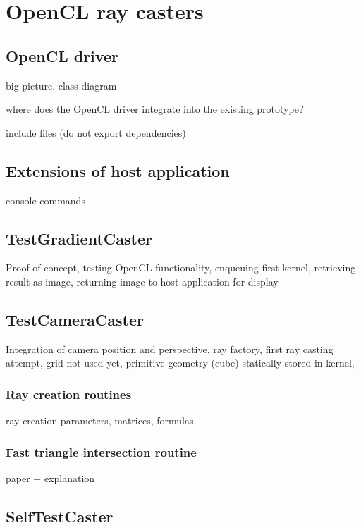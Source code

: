 \section{OpenCL ray casters}
\label{sec:opencl_caster}


\subsection{OpenCL driver}

big picture, class diagram

where does the OpenCL driver integrate into the existing prototype?

include files (do not export dependencies)

\subsection{Extensions of host application}

console commands

\subsection{TestGradientCaster}

Proof of concept, testing OpenCL functionality, enqueuing first kernel, retrieving result as image, returning image to host application for display

\subsection{TestCameraCaster}

Integration of camera position and perspective, ray factory, first ray casting attempt, grid not used yet, primitive geometry (cube) statically stored in kernel,

\subsubsection{Ray creation routines}

ray creation parameters, matrices, formulas

\subsubsection{Fast triangle intersection routine}

paper + explanation

\subsection{SelfTestCaster}

